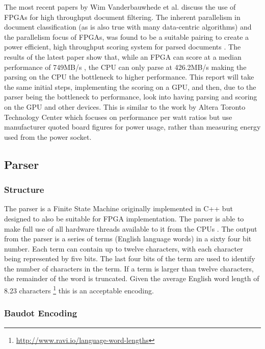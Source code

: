 The most recent papers by Wim Vanderbauwhede et al. discuss the use of FPGAs for
high throughput document filtering. The inherent parallelism in document
classification (as is also true with many data-centric algorithms) and the
parallelism focus of FPGAs, was found to be a suitable pairing to create a power
efficient, high throughput scoring system for parsed documents
\cite{vanderbauwhede2013high} \cite{HybridCPUFPGA}. The results of the latest
paper show that, while an FPGA can score at a median performance of 749MB/s
\cite{vanderbauwhede2013high}, the CPU can only parse at 426.2MB/s making the
parsing on the CPU the bottleneck to higher performance. This report will take
the same initial steps, implementing the scoring on a GPU, and then, due to the
parser being the bottleneck to performance, look into having parsing and scoring
on the GPU and other devices. This is similar to the work by Altera Toronto
Technology Center which focuses on performance per watt ratios
\cite{chen2012invited} but use manufacturer quoted board figures for power
usage, rather than measuring energy used from the power socket.

\subsection{Parser}

\subsubsection{Structure}

The parser is a Finite State Machine originally implemented in C++ but designed
to also be suitable for FPGA implementation. The parser is able to make full use
of all hardware threads available to it from the CPUs \cite{HybridCPUFPGA}. The
output from the parser is a series of terms (English language words) in a sixty
four bit number. Each term can contain up to twelve characters, with each
character being represented by five bits. The last four bits of the term are
used to identify the number of characters in the term. If a term is larger than
twelve characters, the remainder of the word is truncated. Given the average
English word length of 8.23 characters
\footnote{\url{http://www.ravi.io/language-word-lengths}} this is an acceptable
encoding.

\subsubsection{Baudot Encoding}

